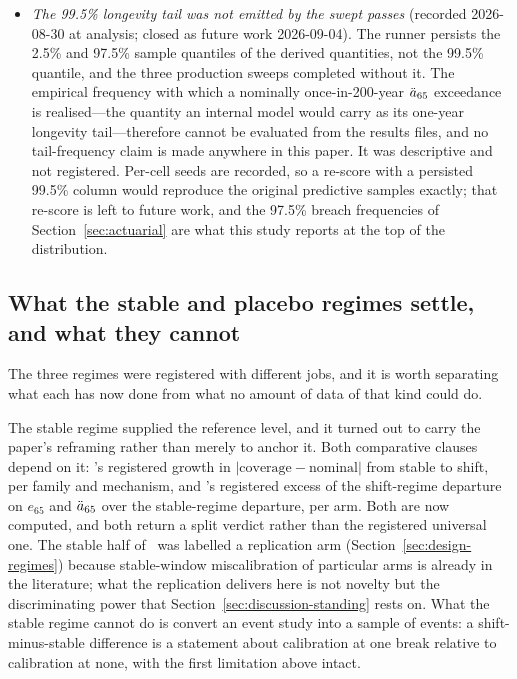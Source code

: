 \begin{itemize}
  of cells in which both compared arms produced a valid row
  (Addendum~3~\S11), and the cluster counts in Table~\ref{tab:dm-mcs}
  state that intersection for each.
\item \emph{The 99.5\% longevity tail was not emitted by the swept passes}
  (recorded 2026-08-30 at analysis; closed as future work 2026-09-04). The
  runner persists the 2.5\% and 97.5\% sample quantiles of the derived
  quantities, not the 99.5\% quantile, and the three production sweeps
  completed without it. The empirical frequency with which a nominally
  once-in-200-year $\ddot{a}_{65}$ exceedance is realised---the quantity an
  internal model would carry as its one-year longevity tail---therefore
  cannot be evaluated from the results files, and no tail-frequency claim
  is made anywhere in this paper. It was descriptive and not registered.
  Per-cell seeds are recorded, so a re-score with a persisted 99.5\%
  column would reproduce the original predictive samples exactly; that
  re-score is left to future work, and the 97.5\% breach frequencies of
  Section~\ref{sec:actuarial} are what this study reports at the top of
  the distribution.
\end{itemize}

\subsection{What the stable and placebo regimes settle, and what they cannot}
\label{sec:discussion-regimes}

The three regimes were registered with different jobs, and it is worth
separating what each has now done from what no amount of data of that
kind could do.

The stable regime supplied the reference level, and it turned out to
carry the paper's reframing rather than merely to anchor it. Both
comparative clauses depend on it: \Htwo's registered growth in
$|\text{coverage}-\text{nominal}|$ from stable to shift, per family and
mechanism, and \Hfive's registered excess of the shift-regime departure
on $e_{65}$ and $\ddot{a}_{65}$ over the stable-regime departure, per arm.
Both are now computed, and both return a split verdict rather than the
registered universal one. The stable half of \Htwo\ was labelled a
replication arm (Section~\ref{sec:design-regimes}) because stable-window
miscalibration of particular arms is already in the literature; what the
replication delivers here is not novelty but the discriminating power
that Section~\ref{sec:discussion-standing} rests on. What the stable
regime cannot do is convert an event study into a sample of events: a
shift-minus-stable difference is a statement about calibration at one
break relative to calibration at none, with the first limitation above
intact.

